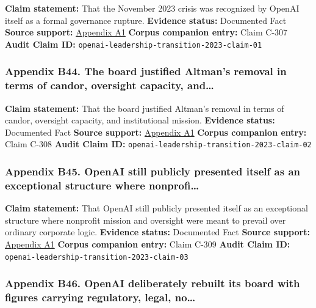 \documentclass[
  american,
  11pt,
  letterpaper,
]{article}
\begin{document}
\textbf{Claim statement:} That the November 2023 crisis was recognized
by OpenAI itself as a formal governance rupture. \textbf{Evidence
status:} Documented Fact \textbf{Source support:}
\hyperref[appendix-a1-openai-announces-leadership-transition]{Appendix
A1} \textbf{Corpus companion entry:} Claim C-307 \textbf{Audit Claim
ID:} \texttt{openai-leadership-transition-2023-claim-01}

\subsubsection{Appendix B44. The board justified Altman's removal in
terms of candor, oversight capacity,
and\ldots{}}\label{appendix-b44-the-board-justified-altmans-removal-in-terms-of-candor-oversight-capacity-and}

\textbf{Claim statement:} That the board justified Altman's removal in
terms of candor, oversight capacity, and institutional mission.
\textbf{Evidence status:} Documented Fact \textbf{Source support:}
\hyperref[appendix-a1-openai-announces-leadership-transition]{Appendix
A1} \textbf{Corpus companion entry:} Claim C-308 \textbf{Audit Claim
ID:} \texttt{openai-leadership-transition-2023-claim-02}

\subsubsection{Appendix B45. OpenAI still publicly presented itself as
an exceptional structure where
nonprofi\ldots{}}\label{appendix-b45-openai-still-publicly-presented-itself-as-an-exceptional-structure-where-nonprofi}

\textbf{Claim statement:} That OpenAI still publicly presented itself as
an exceptional structure where nonprofit mission and oversight were
meant to prevail over ordinary corporate logic. \textbf{Evidence
status:} Documented Fact \textbf{Source support:}
\hyperref[appendix-a1-openai-announces-leadership-transition]{Appendix
A1} \textbf{Corpus companion entry:} Claim C-309 \textbf{Audit Claim
ID:} \texttt{openai-leadership-transition-2023-claim-03}

\subsubsection{Appendix B46. OpenAI deliberately rebuilt its board with
figures carrying regulatory, legal,
no\ldots{}}\label{appendix-b46-openai-deliberately-rebuilt-its-board-with-figures-carrying-regulatory-legal-no}
\end{document}
